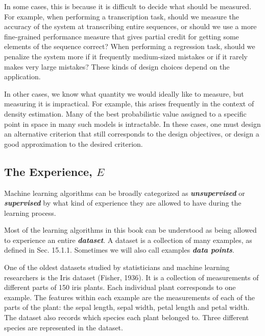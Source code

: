 \documentclass{report}
\begin{document}
\noindent In some cases, this is because it is difficult to decide what should be measured. For example, when performing a transcription task, should we measure the accuracy of the system at transcribing entire sequences, or should we use a more fine-grained performance measure that gives partial credit for getting some elements of the sequence correct? When performing a regression task, should we penalize the system more if it frequently medium-sized mistakes or if it rarely makes very large mistakes? These kinds of design choices depend on the application.\newline

\noindent In other cases, we know what quantity we would ideally like to measure, but measuring it is impractical. For example, this arises frequently in the context of density estimation. Many of the best probabilistic value assigned to a specific point in space in many such models is intractable. In these cases, one must design an alternative criterion that still corresponds to the design objectives, or design a good approximation to the desired criterion.\newline

\subsection{The Experience, $E$}
\noindent Machine learning algorithms can be broadly categorized as \textbf{\textit{unsupervised}} or \textbf{\textit{supervised}} by what kind of experience they are allowed to have during the learning process.\newline

\noindent Most of the learning algorithms in this book can be understood as being allowed to experience an entire \textbf{\textit{dataset}}. A dataset is a collection of many examples, as defined in Sec. 15.1.1. Sometimes we will also call examples \textbf{\textit{data points}}.\newline

\noindent One of the oldest datasets studied by statisticians and machine learning researchers is the Iris dataset (Fisher, 1936). It is a collection of measurements of different parts of 150 iris plants. Each individual plant corresponds to one example. The features within each example are the measurements of each of the parts of the plant: the sepal length, sepal width, petal length and petal width. The dataset also records which species each plant belonged to. Three different species are represented in the dataset.\newline
\end{document}
